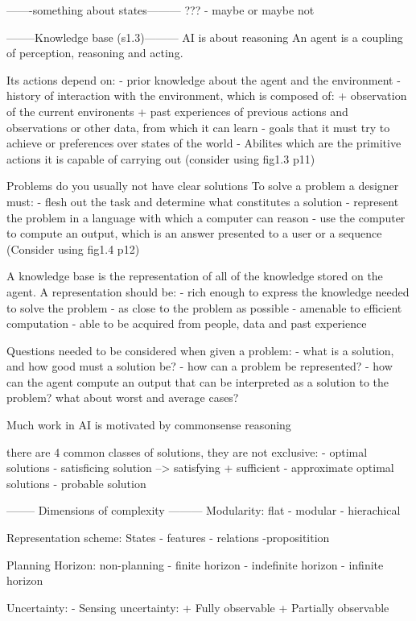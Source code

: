 -------something about states---------
??? - maybe or maybe not

--------Knowledge base (s1.3)---------
AI is about reasoning
An agent is a coupling of perception, reasoning and acting.

Its actions depend on:
- prior knowledge about the agent and the environment
- history of interaction with the environment, which is composed of:
+ observation of the current environents
+ past experiences of previous actions and observations or other data, from
which it can learn
- goals that it must try to achieve or preferences over states of the world
- Abilites which are the primitive actions it is capable of carrying out
(consider using fig1.3 p11)

Problems do you usually not have clear solutions
To solve a problem a designer must:
- flesh out the task and determine what constitutes a solution
- represent the problem in a language with which a computer can reason
- use the computer to compute an output, which is an answer presented to a user
or a sequence
(Consider using fig1.4 p12)

A knowledge base is the representation of all of the knowledge stored on the
agent. A representation should be:
- rich enough to express the knowledge needed to solve the problem
- as close to the problem as possible
- amenable to efficient computation
- able to be acquired from people, data and past experience

Questions needed to be considered when given a problem:
- what is a solution, and how good must a solution be?
- how can a problem be represented?
- how can the agent compute an output that can be interpreted as a solution to
the problem? what about worst and average cases?

Much work in AI is motivated by commonsense reasoning

there are 4 common classes of solutions, they are not exclusive:
- optimal solutions
- satisficing solution --> satisfying + sufficient
- approximate optimal solutions
- probable solution

 -------- Dimensions of complexity ---------
Modularity:
flat - modular - hierachical

Representation scheme:
States - features - relations -propositition

Planning Horizon:
non-planning - finite horizon - indefinite horizon - infinite horizon

Uncertainty:
- Sensing uncertainty:
+ Fully observable
+ Partially observable

